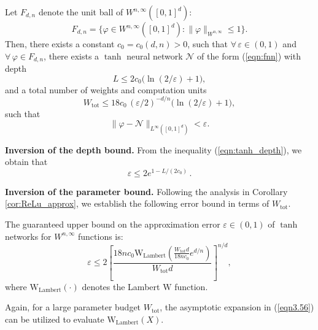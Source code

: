 \documentclass[final,hidelinks,onefignum,onetabnum]{siamart251216}
\begin{document}
\begin{corollary}\label{prop:tanh_bounds_en}
	Let $F_{d,n}$ denote the unit ball of $W^{n,\infty}([0,1]^d)$:
	\[
		F_{d,n}=\bigl\{\varphi\in W^{n,\infty}([0,1]^d):\|\varphi\|_{W^{n,\infty}}\le1\bigr\}.
	\]
	Then, there exists a constant $c_{0}=c_{0}(d,n)>0$, such that $\forall\,\varepsilon\in(0,1)$ and $\forall\,\varphi\in F_{d,n}$, there exists a $\tanh$ neural network $\mathcal{N}$ of the form (\ref{eqn:fnn}) with depth
	\begin{equation} \label{eqn:tanh_depth}
		L\le 2c_{0}\bigl(\ln(2/\varepsilon)+1\bigr),
	\end{equation}
	and a total number of weights and computation units
	\begin{equation} \label{eqn:tanh_weight_upper}
		W_{\mathrm{tot}}\le 18c_{0}\,(\varepsilon/2)^{-d/n}\bigl(\ln(2/\varepsilon)+1\bigr),
	\end{equation}
	such that
	\begin{equation} \label{eqn:tanh_approx}
		\|\varphi-\mathcal{N}\|_{L^\infty([0,1]^d)}<\varepsilon.
	\end{equation}
\end{corollary}

\medskip

\noindent\textbf{Inversion of the depth bound.}
From the inequality (\ref{eqn:tanh_depth}), we obtain that
\begin{equation} \label{eqn:tanh_eps_from_depth}
	\varepsilon \leq 2e^{1 - L/(2c_0)}\,.
\end{equation}

\medskip

\noindent\textbf{Inversion of the parameter bound.}
Following the analysis in Corollary \ref{cor:ReLu_approx}, we establish the following error bound in terms of $W_{\mathrm{tot}}$.

\begin{corollary}\label{cor:tanh_approx}
The guaranteed upper bound on the approximation error $\varepsilon \in (0,1)$ of $\tanh$ networks for $W^{n,\infty}$ functions is:
\begin{equation}\label{eqn:tanh_eps_from_W}
    \varepsilon \le 2\left[ \frac{18n c_{0} \mathrm{W_{Lambert}}\left( \frac{W_{\mathrm{tot}} d}{18n c_{0}} e^{d/n} \right)}{W_{\mathrm{tot}} d} \right]^{n/d},
\end{equation}
where $\mathrm{W_{Lambert}}(\cdot)$ denotes the Lambert $\mathrm{W}$ function.
\end{corollary}

Again, for a large parameter budget $W_{\mathrm{tot}}$, the asymptotic expansion in (\ref{eqn3.56}) can be utilized to evaluate $\mathrm{W_{Lambert}}(X)$.
\end{document}
